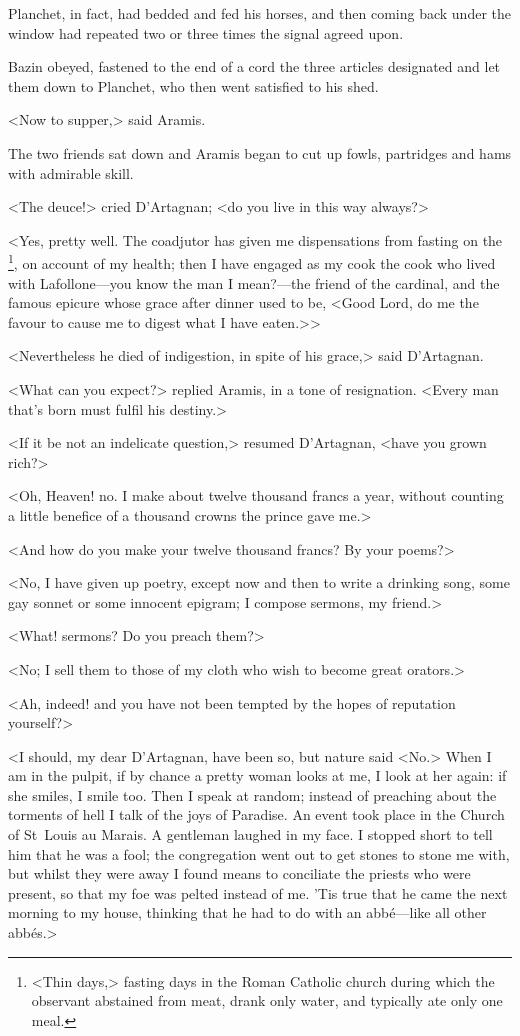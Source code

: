 Planchet, in fact, had bedded and fed his horses, and then coming back under the window had repeated two or three times the signal agreed upon.

Bazin obeyed, fastened to the end of a cord the three articles designated and let them down to Planchet, who then went satisfied to his shed.

<Now to supper,> said Aramis.

The two friends sat down and Aramis began to cut up fowls, partridges and hams with admirable skill.

<The deuce!> cried D'Artagnan; <do you live in this way always?>

<Yes, pretty well. The coadjutor has given me dispensations from fasting on the \footnote{<Thin days,> fasting days in the Roman Catholic church during which the observant abstained from meat, drank only water, and typically ate only one meal.}, on account of my health; then I have engaged as my cook the cook who lived with Lafollone—you know the man I mean?—the friend of the cardinal, and the famous epicure whose grace after dinner used to be, <Good Lord, do me the favour to cause me to digest what I have eaten.>>

<Nevertheless he died of indigestion, in spite of his grace,> said D'Artagnan.

<What can you expect?> replied Aramis, in a tone of resignation. <Every man that's born must fulfil his destiny.>

<If it be not an indelicate question,> resumed D'Artagnan, <have you grown rich?>

<Oh, Heaven! no. I make about twelve thousand francs a year, without counting a little benefice of a thousand crowns the prince gave me.>

<And how do you make your twelve thousand francs? By your poems?>

<No, I have given up poetry, except now and then to write a drinking song, some gay sonnet or some innocent epigram; I compose sermons, my friend.>

<What! sermons? Do you preach them?>

<No; I sell them to those of my cloth who wish to become great orators.>

<Ah, indeed! and you have not been tempted by the hopes of reputation yourself?>

<I should, my dear D'Artagnan, have been so, but nature said <No.> When I am in the pulpit, if by chance a pretty woman looks at me, I look at her again: if she smiles, I smile too. Then I speak at random; instead of preaching about the torments of hell I talk of the joys of Paradise. An event took place in the Church of St~Louis au Marais. A gentleman laughed in my face. I stopped short to tell him that he was a fool; the congregation went out to get stones to stone me with, but whilst they were away I found means to conciliate the priests who were present, so that my foe was pelted instead of me. 'Tis true that he came the next morning to my house, thinking that he had to do with an abbé—like all other abbés.>

